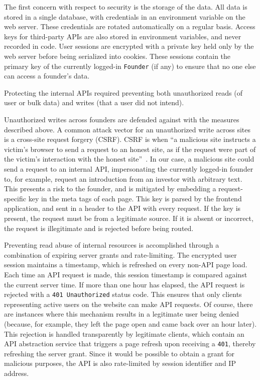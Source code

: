 The first concern with respect to security is the storage of the data. All data is stored in a single database, with credentials in an environment variable on the web server. These credentials are rotated automatically on a regular basis. Access keys for third-party APIs are also stored in environment variables, and never recorded in code. User sessions are encrypted with a private key held only by the web server before being serialized into cookies. These sessions contain the primary key of the currently logged-in \texttt{Founder} (if any) to ensure that no one else can access a founder's data.

Protecting the internal APIs required preventing both unauthorized reads (of user or bulk data) and writes (that a user did not intend).

Unauthorized writes across founders are defended against with the measures described above. A common attack vector for an unauthorized write across sites is a cross-site request forgery (CSRF). CSRF is when ``a malicious site instructs a victim's browser to send a request to an honest site, as if the request were part of the victim's interaction with the honest site''~\cite{Barth:2008:RDC:1455770.1455782}. In our case, a malicious site could send a request to an internal API, impersonating the currently logged-in founder to, for example, request an introduction from an investor with arbitrary text. This presents a risk to the founder, and is mitigated by embedding a request-specific key in the meta tags of each page. This key is parsed by the frontend application, and sent in a header to the API with every request. If the key is present, the request must be from a legitimate source. If it is absent or incorrect, the request is illegitimate and is rejected before being routed.

Preventing read abuse of internal resources is accomplished through a combination of expiring server grants and rate-limiting. The encrypted user session maintains a timestamp, which is refreshed on every non-API page load. Each time an API request is made, this session timestamp is compared against the current server time. If more than one hour has elapsed, the API request is rejected with a \texttt{401 Unauthorized} status code. This ensures that only clients representing active users on the website can make API requests. Of course, there are instances where this mechanism results in a legitimate user being denied (because, for example, they left the page open and came back over an hour later). This rejection is handled transparently by legitimate clients, which contain an API abstraction service that triggers a page refresh upon receiving a \texttt{401}, thereby refreshing the server grant. Since it would be possible to obtain a grant for malicious purposes, the API is also rate-limited by session identifier and IP address.

